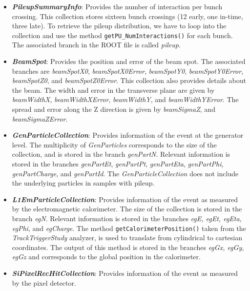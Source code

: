 \documentclass[a4paper,12pt,oneside]{article}
\begin{document}
                   \begin{itemize}
                   \item \textbf{\textit{PileupSummaryInfo}}: Provides the number of interaction per bunch crossing. This collection stores sixteen bunch crossings (12 early, one in-time, three late). To retrieve the pileup distribution, we have to loop into the collection and use the method
 \texttt{getPU\_NumInteractions()} for each bunch. The associated branch in the ROOT file is called  {\it pileup}.
                   \item \textbf{\textit{BeamSpot}}: Provides the position and error of the beam spot.  The associated branches are
                     {\it beamSpotX0}, {\it beamSpotX0Error}, {\it beamSpotY0}, {\it beamSpotY0Error}, {\it beamSpotZ0}, and
                     {\it beamSpotZ0Error}. This collection also provides details about the beam. The width and error in the
                     transverse plane are given by {\it beamWidthX}, {\it beamWidthXError}, {\it beamWidthY}, and
                     {\it beamWidthYError}. The spread and error along the Z direction is given by {\it beamSigmaZ}, and {\it beamSigmaZError}.
                   \item \textbf{\textit{GenParticleCollection}}: Provides information of the event at the generator level. The
                     multiplicity of \textit{GenParticles} corresponds to the size of the collection, and is stored in the branch
                     {\it genPartN}. Relevant information is stored in the branches {\it genPartEt}, {\it genPartPt},
                     {\it genPartEta}, {\it genPartPhi}, {\it genPartCharge}, and {\it genPartId}. The \textit{GenParticleCollection}
                     does not include the underlying particles in samples with pileup. 
                   \item \textbf{\textit{L1EmParticleCollection}}: Provides information of the event as measured by the electromagnetic
                     calorimeter. The size of the collection is stored in the branch {\it egN}.
                     Relevant information is stored in the branches {\it egE, egEt, egEta, egPhi}, and \textit{egCharge}. The method
                     \texttt{getCalorimeterPosition()} taken from the \textit{TrackTriggerStudy} analyzer, is used to translate from cylindrical to cartesian coordinates. The output
                     of this method is stored in the branches {\it egGx, egGy, egGz} and corresponds to the global position in the calorimeter.
                   \item \textbf{\textit{SiPixelRecHitCollection}}: Provides information of the event as measured by the pixel detector.

\end{itemize}
\end{document}
